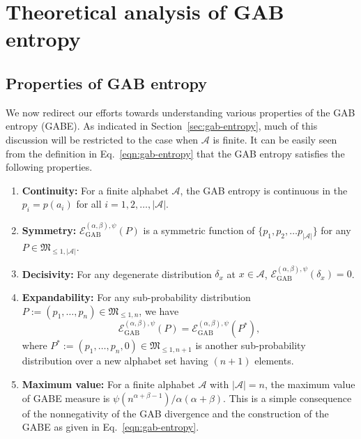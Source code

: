 \documentclass[11pt]{article}
\theoremstyle{plain}
\theoremstyle{remark}
\newcommand{\Acal}{\mathcal{A}}
\newcommand{\Mfrak}{\mathfrak{M}}
\newcommand{\eGAB}{\mathcal{E}_{\mathrm{GAB}}}
\newcommand{\todo}[1]{\textcolor{red}{#1}}
\begin{document}
\section{Theoretical analysis of GAB entropy}\label{sec:theory-gab-entropy}

\subsection{Properties of GAB entropy}\label{sec:gabe-properties}

We now redirect our efforts towards understanding various properties of the GAB entropy (GABE). As indicated in Section~\ref{sec:gab-entropy}, much of this discussion will be restricted to the case when $\Acal$ is finite. It can be easily seen from the definition in Eq.~\eqref{eqn:gab-entropy} that the GAB entropy satisfies the following properties.
\begin{enumerate}
    \item \textbf{Continuity:} For a finite alphabet $\mathcal{A}$, the GAB entropy is continuous in the $p_i = p(a_i)$ for all $i = 1, 2, \dots, \vert \Acal\vert$.
    \item \textbf{Symmetry:} $\eGAB^{(\alpha,\beta),\psi}(P)$ is a symmetric function of $\{ p_1, p_2, \dots p_{\vert \Acal\vert} \}$ for any $P \in \Mfrak_{\leq 1, \vert \Acal\vert}$.
    \item \textbf{Decisivity:} For any degenerate distribution $\delta_x$ at $x \in \mathcal{A}$, $\eGAB^{(\alpha,\beta),\psi}(\delta_x) = 0$.
    \item \textbf{Expandability:} For any sub-probability distribution $P := (p_1, \dots, p_n) \in \Mfrak_{\leq 1, n}$, we have
          \begin{equation*}
              \eGAB^{(\alpha,\beta),\psi}(P) = \eGAB^{(\alpha,\beta),\psi}(P^\ast),
          \end{equation*}
          \noindent where $P^\ast := (p_1, \dots, p_n, 0) \in \Mfrak_{\leq 1, n+1}$ is another sub-probability distribution over a new alphabet set having $(n+1)$ elements.
    \item \textbf{Maximum value:} For a finite alphabet $\Acal$ with $\vert \Acal\vert = n$, the maximum value of GABE measure is $\psi(n^{\alpha+\beta-1})/\alpha(\alpha+\beta)$. This is a simple consequence of the nonnegativity of the GAB divergence and the construction of the GABE as given in Eq.~\eqref{eqn:gab-entropy}.
\end{enumerate}


\end{document}
